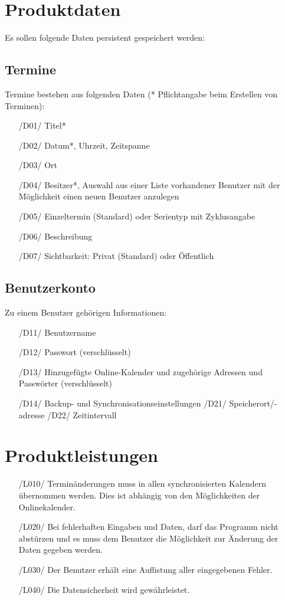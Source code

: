 \documentclass[a4paper]{article}
\begin{document}
  \section{Produktdaten}
	Es sollen folgende Daten persistent gespeichert werden:
	  \subsection{Termine}
	  Termine bestehen aus folgenden Daten (* Pflichtangabe beim Erstellen von Terminen):
        \begin{itemize}
				  \item[/D01/] Titel*
				  \item[/D02/] Datum*, Uhrzeit, Zeitspanne
				  \item[/D03/] Ort
				  \item[/D04/] Besitzer*, Auswahl aus einer Liste vorhandener Benutzer mit der Möglichkeit einen neuen Benutzer anzulegen
				  \item[/D05/] Einzeltermin (Standard) oder Serientyp mit Zyklusangabe
				  \item[/D06/] Beschreibung
				  \item[/D07/] Sichtbarkeit: Privat (Standard) oder Öffentlich
        \end{itemize}
	  \subsection{Benutzerkonto}
		  Zu einem Benutzer gehörigen Informationen:
  		  \begin{itemize}
  		  	\item[/D11/] Benutzername
  		  	\item[/D12/] Passwort (verschlüsselt)
  		  	\item[/D13/] Hinzugefügte Online-Kalender und zugehörige Adressen und Passwörter (verschlüsselt)
  		  	\item[/D14/] Backup- und Synchronisationseinstellungen
  		  		\subitem /D21/ Speicherort/-adresse
  		  		\subitem /D22/ Zeitintervall
		  \end{itemize}


  \section{Produktleistungen}
    \begin{itemize}
	     \item[/L010/] Terminänderungen muss in allen synchronisierten Kalendern übernommen werden. Dies ist abhängig von den Möglichkeiten der Onlinekalender.
	     \item[/L020/] Bei fehlerhaften Eingaben und Daten, darf das Programm nicht abstürzen und es muss dem Benutzer die Möglichkeit zur Änderung der Daten gegeben werden.
			 \item[/L030/] Der Benutzer erhält eine Auflistung aller eingegebenen Fehler.
			 \item[/L040/] Die Datensicherheit wird gewährleistet.
    \end{itemize}
\end{document}
